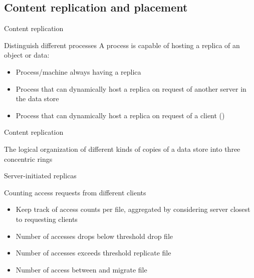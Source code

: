\subsection{Content replication and placement}
\begin{slide}{Content replication}
  \begin{block}{Distinguish different processes}
    A process is capable of hosting a replica of an object or data:
    \begin{itemize}
    \item {} Process/machine always having a replica
    \item {} Process that can dynamically host a replica on request of another
      server in the data store
    \item {} Process that can dynamically host a replica on request of a client
      ()
    \end{itemize}
  \end{block}
\end{slide}
\begin{slide}{Content replication}
  \begin{block}{The logical organization of different kinds of copies of a data store into three
    concentric rings}
    \begin{centerfig}
    \end{centerfig}
  \end{block}
\end{slide}
  \begin{slide}{Server-initiated replicas}
    \begin{exampleblock}{Counting access requests from different clients}
      \begin{centerfig}
      \end{centerfig}
      \begin{itemize}\tightlist
      \item Keep track of access counts per file, aggregated by considering server closest to requesting clients
      \item Number of accesses drops below threshold  \mathexpr{{\Rightarrow}} drop file
      \item Number of accesses exceeds threshold  \mathexpr{{\Rightarrow}} replicate file
      \item Number of access between  and  \mathexpr{{\Rightarrow}} migrate file
      \end{itemize}
    \end{exampleblock}
  \end{slide}
